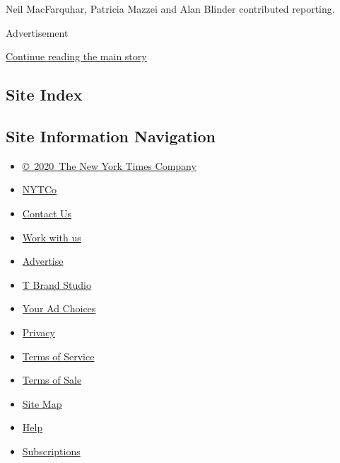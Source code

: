 Neil MacFarquhar, Patricia Mazzei and Alan Blinder contributed
reporting.

Advertisement

\protect\hyperlink{after-bottom}{Continue reading the main story}

\hypertarget{site-index}{%
\subsection{Site Index}\label{site-index}}

\hypertarget{site-information-navigation}{%
\subsection{Site Information
Navigation}\label{site-information-navigation}}

\begin{itemize}
\tightlist
\item
  \href{https://help.nytimes3xbfgragh.onion/hc/en-us/articles/115014792127-Copyright-notice}{©~2020~The
  New York Times Company}
\end{itemize}

\begin{itemize}
\tightlist
\item
  \href{https://www.nytco.com/}{NYTCo}
\item
  \href{https://help.nytimes3xbfgragh.onion/hc/en-us/articles/115015385887-Contact-Us}{Contact
  Us}
\item
  \href{https://www.nytco.com/careers/}{Work with us}
\item
  \href{https://nytmediakit.com/}{Advertise}
\item
  \href{http://www.tbrandstudio.com/}{T Brand Studio}
\item
  \href{https://www.nytimes3xbfgragh.onion/privacy/cookie-policy\#how-do-i-manage-trackers}{Your
  Ad Choices}
\item
  \href{https://www.nytimes3xbfgragh.onion/privacy}{Privacy}
\item
  \href{https://help.nytimes3xbfgragh.onion/hc/en-us/articles/115014893428-Terms-of-service}{Terms
  of Service}
\item
  \href{https://help.nytimes3xbfgragh.onion/hc/en-us/articles/115014893968-Terms-of-sale}{Terms
  of Sale}
\item
  \href{https://spiderbites.nytimes3xbfgragh.onion}{Site Map}
\item
  \href{https://help.nytimes3xbfgragh.onion/hc/en-us}{Help}
\item
  \href{https://www.nytimes3xbfgragh.onion/subscription?campaignId=37WXW}{Subscriptions}
\end{itemize}
